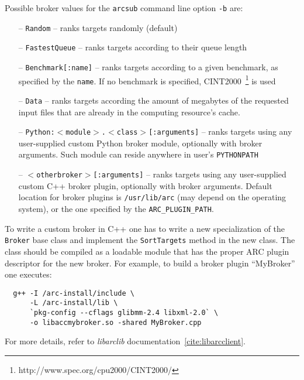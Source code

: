 
Possible broker values for the \texttt{arcsub} command line option \verb#-b# are:
\begin{itemize}
 \item[--] \texttt{Random} -- ranks targets randomly (default)
 \item[--] \texttt{FastestQueue} -- ranks targets according to their queue length
 \item[--] \texttt{Benchmark[:name]} -- ranks targets according to a given benchmark, as specified by the \texttt{name}. If no benchmark is specified, CINT2000~\footnote{http://www.spec.org/cpu2000/CINT2000/} is used
 \item[--] \texttt{Data} -- ranks targets according the amount of megabytes of the
requested input files that are already in the computing resource’s cache.
 \item[--] \texttt{Python:$<$module$>$.$<$class$>$[:arguments]} -- ranks targets using any user-supplied custom Python broker module, optionally with broker arguments. Such module can reside anywhere in user's \texttt{PYTHONPATH}
 \item[--] \texttt{$<$otherbroker$>$[:arguments]} -- ranks targets using any user-supplied custom C++ broker plugin, optionally with broker arguments. Default location for broker plugins is \texttt{/usr/lib/arc} (may depend on the operating system), or the one specified by the \texttt{ARC\_PLUGIN\_PATH}.
\end{itemize}

To write a custom broker in C++ one has to write a new specialization of the \texttt{Broker} base class and implement the \texttt{SortTargets} method in the new class. The class should be compiled as a loadable
module that has the proper ARC plugin descriptor for the new broker. For example, to build a broker plugin ``MyBroker'' one executes:
\begin{lstlisting}
  g++ -I /arc-install/include \
      -L /arc-install/lib \
      `pkg-config --cflags glibmm-2.4 libxml-2.0` \
      -o libaccmybroker.so -shared MyBroker.cpp
\end{lstlisting}
For more details, refer to \textit{libarclib} documentation~\ref{cite:libarcclient}.

